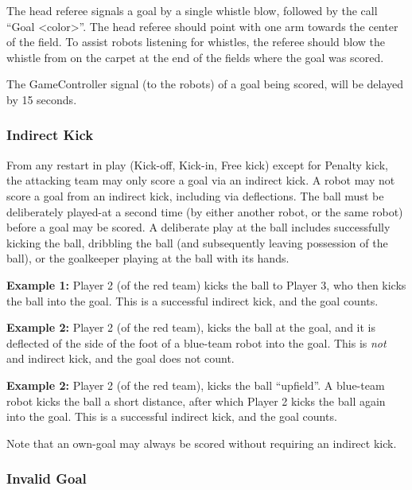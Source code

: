 \documentclass[12pt]{article}
\newcommand{\GoalScoredDelay}{15 seconds\xspace}
\begin{document}
The head referee signals a goal by a single whistle blow, followed by the call ``Goal \textless color\textgreater''.
The head referee should point with one arm towards the center of the field.
To assist robots listening for whistles, the referee should blow the whistle from on the carpet at the end of the fields where the goal was scored.

The GameController signal (to the robots) of a goal being scored, will be delayed by \GoalScoredDelay.

\subsubsection{Indirect Kick}
\label{sec:indirect_kick}

From any restart in play (Kick-off, Kick-in, Free kick) except for Penalty kick, the attacking team may only score a goal via an indirect kick.
A robot may not score a goal from an indirect kick, including via deflections.
The ball must be deliberately played-at a second time (by either another robot, or the same robot) before a goal may be scored.
A deliberate play at the ball includes successfully kicking the ball, dribbling the ball (and subsequently leaving possession of the ball), or the goalkeeper playing at the ball with its hands. 

\textbf{Example 1:} Player 2 (of the red team) kicks the ball to Player 3, who then kicks the ball into the goal. This is a successful indirect kick, and the goal counts.

\textbf{Example 2:} Player 2 (of the red team), kicks the ball at the goal, and it is deflected of the side of the foot of a blue-team robot into the goal. This is \textit{not} and indirect kick, and the goal does not count.

\textbf{Example 2:} Player 2 (of the red team), kicks the ball ``upfield''. A blue-team robot kicks the ball a short distance, after which Player 2 kicks the ball again into the goal. This is a successful indirect kick, and the goal counts.

Note that an own-goal may always be scored without requiring an indirect kick.

\subsubsection{Invalid Goal}
\label{sec:invalid_goal}
\end{document}

